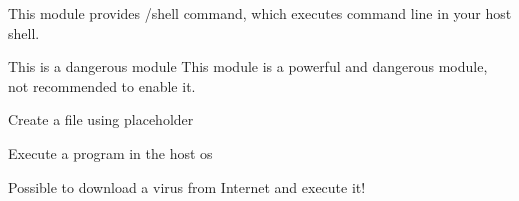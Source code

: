 
This module provides /shell command, which executes command line in your host shell.

\begin{warn}{This is a dangerous module}
    This module is a powerful and dangerous module, not recommended to enable it.
\end{warn}


\begin{example}{Create a file using placeholder}
\end{example}

\begin{example}{Execute a program in the host os}
\end{example}

\begin{example}{Possible to download a virus from Internet and execute it!}
\end{example}